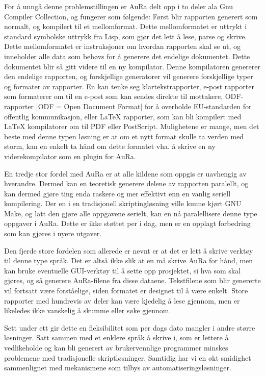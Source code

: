 \documentclass[norsk, 11pt, a4paper]{article}
\begin{document}
For å unngå denne problemstillingen er AuRa delt opp i to deler ala Gnu Compiler Collection, og fungerer som følgende: Først blir rapporten generert som normalt, og kompilert til et mellomformat. Dette mellomformatet er uttrykt i standard symbolske uttrykk fra Lisp, som gjør det lett å lese, parse og skrive. Dette mellomformatet er instruksjoner om hvordan rapporten skal se ut, og inneholder alle data som behøvs for å generere det endelige dokumentet. Dette dokumentet blir så gitt videre til en ny kompilator. Denne kompilatoren genererer den endelige rapporten, og forskjellige generatorer vil generere forskjellige typer og formater av rapporter. En kan tenke seg klartekstrapporter, e-post rapporter som formaterer om til en e-post som kan sendes direkte til mottakere, ODF-rapporter |ODF = Open Document Format| for å overholde EU-standarden for offentlig kommunikasjon, eller LaTeX rapporter, som kan bli kompilert med LaTeX kompilatorer om til PDF eller PostScript. Mulighetene er mange, men det beste med denne typen løsning er at om et nytt format skulle ta verden med storm, kan en enkelt ta hånd om dette formatet vha. å skrive en ny viderekompilator som en plugin for AuRa.



En tredje stor fordel med AuRa er at alle kildene som oppgis er uavhengig av hverandre. Dermed kan en teoretisk generere delene av rapporten paralellt, og kan dermed gjøre ting enda raskere og mer effektivt enn en vanlig seriell kompilering. Der en i en tradisjonell skriptingløsning ville kunne kjørt GNU Make, og latt den gjøre alle oppgavene serielt, kan en nå paralellisere denne type oppgaver i AuRa. Dette er ikke støttet per i dag, men er en opplagt forbedring som kan gjøres i nyere utgaver.



Den fjerde store fordelen som allerede er nevnt er at det er lett å skrive verktøy til denne type språk. Det er altså ikke slik at en må skrive AuRa for hånd, men kan bruke eventuelle GUI-verktøy til å sette opp prosjektet, si hva som skal gjøres, og så generere AuRa-filene fra disse dataene. Tekstfilene som blir genererte vil fortsatt være forståelige, siden formatet er designet til å være enkelt. Store rapporter med hundrevis av deler kan være kjedelig å lese gjennom, men er likeledes ikke vanskelig å skumme eller søke gjennom.



Sett under ett gir dette en fleksibilitet som per dags dato mangler i andre større løsninger. Satt sammen med et enklere språk å skrive i, som er lettere å vedlikeholde og kan bli generert av brukervennlige programmer minskes problemene med tradisjonelle skriptløsninger. Samtidig har vi en økt smidighet sammenlignet med mekanismene som tilbys av automatiseringsløsninger. 
\end{document}
